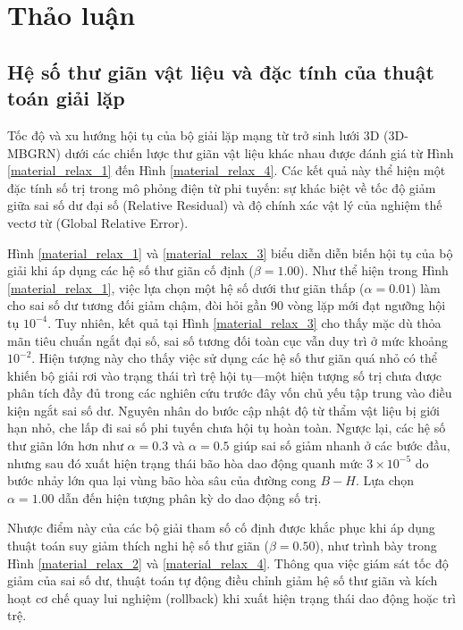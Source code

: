 \section{Thảo luận}
\subsection{Hệ số thư giãn vật liệu và đặc tính của thuật toán giải lặp}

Tốc độ và xu hướng hội tụ của bộ giải lặp mạng từ trở sinh lưới 3D (3D-MBGRN) dưới các chiến lược thư giãn vật liệu khác nhau được đánh giá từ Hình \ref{material_relax_1} đến Hình \ref{material_relax_4}. Các kết quả này thể hiện một đặc tính số trị trong mô phỏng điện từ phi tuyến: sự khác biệt về tốc độ giảm giữa sai số dư đại số (Relative Residual) và độ chính xác vật lý của nghiệm thế vectơ từ (Global Relative Error).

Hình \ref{material_relax_1} và \ref{material_relax_3} biểu diễn diễn biến hội tụ của bộ giải khi áp dụng các hệ số thư giãn cố định ($\beta = 1.00$). Như thể hiện trong Hình \ref{material_relax_1}, việc lựa chọn một hệ số dưới thư giãn thấp ($\alpha = 0.01$) làm cho sai số dư tương đối giảm chậm, đòi hỏi gần 90 vòng lặp mới đạt ngưỡng hội tụ $10^{-4}$. Tuy nhiên, kết quả tại Hình \ref{material_relax_3} cho thấy mặc dù thỏa mãn tiêu chuẩn ngắt đại số, sai số tương đối toàn cục vẫn duy trì ở mức khoảng $10^{-2}$. Hiện tượng này cho thấy việc sử dụng các hệ số thư giãn quá nhỏ có thể khiến bộ giải rơi vào trạng thái trì trệ hội tụ—một hiện tượng số trị chưa được phân tích đầy đủ trong các nghiên cứu trước đây vốn chủ yếu tập trung vào điều kiện ngắt sai số dư. Nguyên nhân do bước cập nhật độ từ thẩm vật liệu bị giới hạn nhỏ, che lấp đi sai số phi tuyến chưa hội tụ hoàn toàn. Ngược lại, các hệ số thư giãn lớn hơn như $\alpha = 0.3$ và $\alpha = 0.5$ giúp sai số giảm nhanh ở các bước đầu, nhưng sau đó xuất hiện trạng thái bão hòa dao động quanh mức $3 \times 10^{-5}$ do bước nhảy lớn qua lại vùng bão hòa sâu của đường cong $B-H$. Lựa chọn $\alpha = 1.00$ dẫn đến hiện tượng phân kỳ do dao động số trị.

Nhược điểm này của các bộ giải tham số cố định được khắc phục khi áp dụng thuật toán suy giảm thích nghi hệ số thư giãn ($\beta = 0.50$), như trình bày trong Hình \ref{material_relax_2} và \ref{material_relax_4}. Thông qua việc giám sát tốc độ giảm của sai số dư, thuật toán tự động điều chỉnh giảm hệ số thư giãn và kích hoạt cơ chế quay lui nghiệm (rollback) khi xuất hiện trạng thái dao động hoặc trì trệ.

